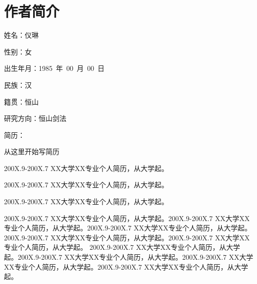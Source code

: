 ﻿%

%
%

\chapter*{\hfill 作者简介 \hfill}
\begin{window}
\end{window}
\daxiaosi
姓名：仪琳

性别：女

出生年月：1985~年~00~月~00~日

民族：汉

籍贯：恒山

研究方向：恒山剑法

简历：

\xiaosi
从这里开始写简历

200X.9-200X.7  XX大学XX专业个人简历，从大学起。

200X.9-200X.7  XX大学XX专业个人简历，从大学起。

200X.9-200X.7  XX大学XX专业个人简历，从大学起。

200X.9-200X.7  XX大学XX专业个人简历，从大学起。200X.9-200X.7  XX大学XX专业个人简历，从大学起。200X.9-200X.7  XX大学XX专业个人简历，从大学起。200X.9-200X.7  XX大学XX专业个人简历，从大学起。200X.9-200X.7  XX大学XX专业个人简历，从大学起。
200X.9-200X.7  XX大学XX专业个人简历，从大学起。200X.9-200X.7  XX大学XX专业个人简历，从大学起。200X.9-200X.7  XX大学XX专业个人简历，从大学起。200X.9-200X.7  XX大学XX专业个人简历，从大学起。
